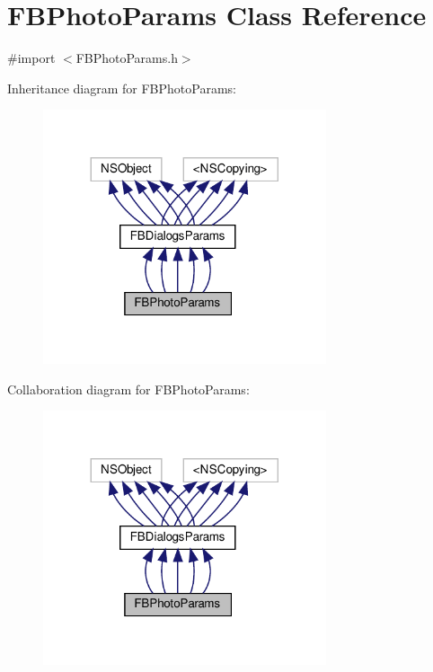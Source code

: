 \hypertarget{interfaceFBPhotoParams}{}\section{F\+B\+Photo\+Params Class Reference}
\label{interfaceFBPhotoParams}


{\ttfamily \#import $<$F\+B\+Photo\+Params.\+h$>$}



Inheritance diagram for F\+B\+Photo\+Params\+:
\nopagebreak
\begin{figure}[H]
\begin{center}
\leavevmode
\includegraphics[width=236pt]{interfaceFBPhotoParams__inherit__graph}
\end{center}
\end{figure}


Collaboration diagram for F\+B\+Photo\+Params\+:
\nopagebreak
\begin{figure}[H]
\begin{center}
\leavevmode
\includegraphics[width=236pt]{interfaceFBPhotoParams__coll__graph}
\end{center}
\end{figure}
